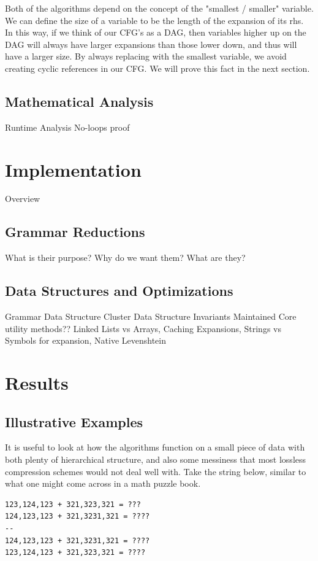\documentclass[11pt]{article}
\begin{document}
Both of the algorithms depend on the concept of the "smallest / smaller"
variable. We can define the size of a variable to be the length of
the expansion of its rhs. In this way, if we think of our CFG's as a DAG, then
variables higher up on the DAG will always have larger expansions than
those lower down, and thus will have a larger size. By always replacing
with the smallest variable, we avoid creating cyclic references in our CFG.
We will prove this fact in the next section.

\subsection{Mathematical Analysis}
Runtime Analysis
No-loops proof

\section{Implementation}
Overview

\subsection{Grammar Reductions}
What is their purpose? Why do we want them? What are they?

\subsection{Data Structures and Optimizations}
Grammar Data Structure
Cluster Data Structure
Invariants Maintained
Core utility methods??
Linked Lists vs Arrays, Caching Expansions, Strings vs Symbols for expansion, Native Levenshtein

\section{Results}
\subsection{Illustrative Examples}
It is useful to look at how the algorithms function on a small piece of
data with both plenty of hierarchical structure, and also some messiness
that most lossless compression schemes would not deal well with. Take
the string below, similar to what one might come across in a math
puzzle book.

\begin{verbatim}
123,124,123 + 321,323,321 = ???
124,123,123 + 321,3231,321 = ????
--
124,123,123 + 321,3231,321 = ????
123,124,123 + 321,323,321 = ????
\end{verbatim}
\end{document}
